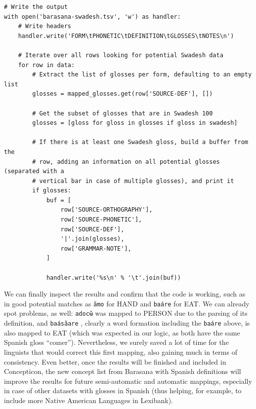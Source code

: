 \documentclass[
  a4paper,
  14pt,
  oneside,
  tablecaptionabove
]{scrbook}
\newcommand{\passthrough}[1]{#1}
\begin{document}
\begin{lstlisting}
# Write the output
with open('barasana-swadesh.tsv', 'w') as handler:
    # Write headers
    handler.write('FORM\tPHONETIC\tDEFINITION\tGLOSSES\tNOTES\n')

    # Iterate over all rows looking for potential Swadesh data
    for row in data:
        # Extract the list of glosses per form, defaulting to an empty list
        glosses = mapped_glosses.get(row['SOURCE-DEF'], [])

        # Get the subset of glosses that are in Swadesh 100
        glosses = [gloss for gloss in glosses if gloss in swadesh]

        # If there is at least one Swadesh gloss, build a buffer from the
        # row, adding an information on all potential glosses (separated with a
        # vertical bar in case of multiple glosses), and print it
        if glosses:
            buf = [
                row['SOURCE-ORTHOGRAPHY'],
                row['SOURCE-PHONETIC'],
                row['SOURCE-DEF'],
                '|'.join(glosses),
                row['GRAMMAR-NOTE'],
            ]

            handler.write('%s\n' % '\t'.join(buf))
\end{lstlisting}

We can finally inspect the results and confirm that the code is working,
such as in good potential matches as \passthrough{\lstinline!ãmo!} for
HAND and \passthrough{\lstinline!baáre!} for EAT. We can already spot
problems, as well: \passthrough{\lstinline!adocʉ̃!} was mapped to PERSON
due to the parsing of its definition, and
\passthrough{\lstinline!baásãare!} , clearly a word formation including
the \passthrough{\lstinline!baáre!} above, is also mapped to EAT (which
was expected in our logic, as both have the same Spanish gloss
\enquote{comer}). Nevertheless, we surely saved a lot of time for the
linguists that would correct this first mapping, also gaining much in
terms of consistency. Even better, once the results will be finished and
included in Concepticon, the new concept list from Barasana with Spanish
definitions will improve the results for future semi-automatic and
automatic mappings, especially in case of other datasets with glosses in
Spanish (thus helping, for example, to include more Native American
Languages in Lexibank).
\end{document}
